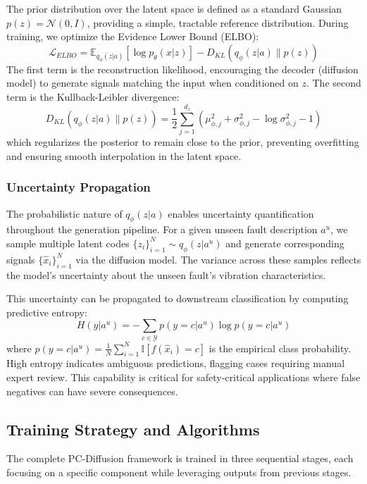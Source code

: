 The prior distribution over the latent space is defined as a standard Gaussian $p(z) = \mathcal{N}(0, I)$, providing a simple, tractable reference distribution. During training, we optimize the Evidence Lower Bound (ELBO):
\begin{equation}
    \mathcal{L}_{ELBO} = \mathbb{E}_{q_\phi(z|a)} [\log p_\theta(x|z)] - D_{KL}(q_\phi(z|a) \| p(z))
    \label{eq:elbo}
\end{equation}
The first term is the reconstruction likelihood, encouraging the decoder (diffusion model) to generate signals matching the input when conditioned on $z$. The second term is the Kullback-Leibler divergence:
\begin{equation}
    D_{KL}(q_\phi(z|a) \| p(z)) = \frac{1}{2} \sum_{j=1}^{d_z} \left( \mu_{\phi,j}^2 + \sigma_{\phi,j}^2 - \log \sigma_{\phi,j}^2 - 1 \right)
    \label{eq:kl_divergence}
\end{equation}
which regularizes the posterior to remain close to the prior, preventing overfitting and ensuring smooth interpolation in the latent space.

\subsubsection{Uncertainty Propagation}
The probabilistic nature of $q_\phi(z|a)$ enables uncertainty quantification throughout the generation pipeline. For a given unseen fault description $a^u$, we sample multiple latent codes $\{z_i\}_{i=1}^N \sim q_\phi(z|a^u)$ and generate corresponding signals $\{\hat{x}_i\}_{i=1}^N$ via the diffusion model. The variance across these samples reflects the model's uncertainty about the unseen fault's vibration characteristics.

This uncertainty can be propagated to downstream classification by computing predictive entropy:
\begin{equation}
    H(y|a^u) = -\sum_{c \in \mathcal{Y}} p(y=c|a^u) \log p(y=c|a^u)
    \label{eq:predictive_entropy}
\end{equation}
where $p(y=c|a^u) = \frac{1}{N}\sum_{i=1}^N \mathbb{I}[f(\hat{x}_i) = c]$ is the empirical class probability. High entropy indicates ambiguous predictions, flagging cases requiring manual expert review. This capability is critical for safety-critical applications where false negatives can have severe consequences.

\subsection{Training Strategy and Algorithms}
The complete PC-Diffusion framework is trained in three sequential stages, each focusing on a specific component while leveraging outputs from previous stages.

